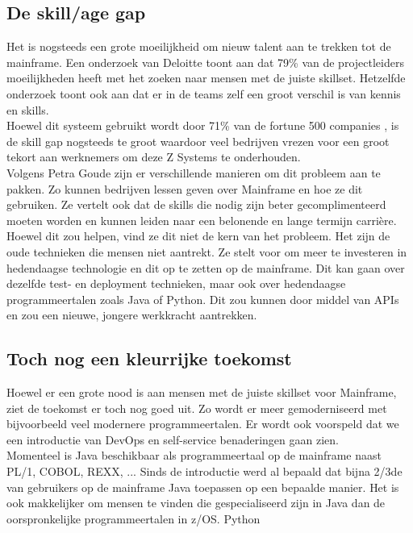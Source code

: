 \subsection{De skill/age gap}
Het is nogsteeds een grote moeilijkheid om nieuw talent aan te trekken tot de mainframe. Een onderzoek van Deloitte toont aan dat 79\% van de projectleiders moeilijkheden heeft met het zoeken naar mensen met de juiste skillset. Hetzelfde onderzoek toont ook aan dat er in de teams zelf een groot verschil is van kennis en skills. \textcite{Deloitte2020} \\ Hoewel dit systeem gebruikt wordt door 71\% van de fortune 500 companies \autocite{Tozzi2022} , is de skill gap nogsteeds te groot waardoor veel bedrijven vrezen voor een groot tekort aan werknemers om deze Z Systems te onderhouden.
\\
Volgens Petra Goude \textcite{Goude2023} zijn er verschillende manieren om dit probleem aan te pakken. Zo kunnen bedrijven lessen geven over Mainframe en hoe ze dit gebruiken. Ze vertelt ook dat de skills die nodig zijn beter gecomplimenteerd moeten worden en kunnen leiden naar een belonende en lange termijn carrière. Hoewel dit zou helpen, vind ze dit niet de kern van het probleem. Het zijn de oude technieken die mensen niet aantrekt. Ze stelt voor om meer te investeren in hedendaagse technologie en dit op te zetten op de mainframe. Dit kan gaan over dezelfde test- en deployment technieken, maar ook over hedendaagse programmeertalen zoals Java of Python. Dit zou kunnen door middel van APIs en zou een nieuwe, jongere werkkracht aantrekken.


\subsection{Toch nog een kleurrijke toekomst}
Hoewel er een grote nood is aan mensen met de juiste skillset voor Mainframe, ziet de toekomst er toch nog goed uit. Zo wordt er meer gemoderniseerd met bijvoorbeeld veel modernere programmeertalen. Er wordt ook voorspeld dat we een introductie van DevOps en self-service benaderingen gaan zien. \autocite{Pennaz2023} \\
Momenteel is Java beschikbaar als programmeertaal op de mainframe naast PL/1, COBOL, REXX, ...
Sinds de introductie werd al bepaald dat bijna 2/3de van gebruikers op de mainframe Java toepassen op een bepaalde manier. \autocite{Watts2018}
Het is ook makkelijker om mensen te vinden die gespecialiseerd zijn in Java dan de oorspronkelijke programmeertalen in z/OS. 
Python 

